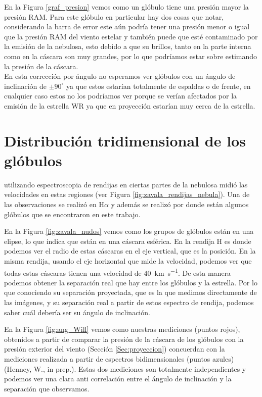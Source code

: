 \documentclass{book}
\begin{document}
En la Figura \ref{graf_presion} vemos como un glóbulo tiene una presión mayor la presión RAM. Para este glóbulo en particular hay dos cosas que notar, considerando la barra de error este aún podría tener una presión menor o igual que la presión RAM del viento estelar y también puede que esté contaminado por la emisión de la nebulosa, esto debido a que su brillos, tanto en la parte interna como en la cáscara son muy grandes, por lo que podríamos estar sobre estimando la presión de la cáscara.\\

En esta corrección por ángulo no esperamos ver glóbulos con un ángulo de inclinación de $\pm 90^\circ$ ya que estos estarían totalmente de espaldas o de frente, en cualquier caso estos no los podríamos ver porque se verían afectados por la emisión de la estrella WR ya que en proyección estarían muy cerca de la estrella.

\section{Distribución tridimensional de los glóbulos} \label{sec: distrtibucion}

\cite{Zavala:2022} utilizando espectroscopia de rendijas en ciertas partes de la nebulosa midió las velocidades en estas regiones (ver Figura \ref{fig:zavala_rendijas_nebula}). Una de las observaciones se realizó en H$\alpha$ y además se realizó por donde están algunos glóbulos que se encontraron en este trabajo. 

En la Figura \ref{fig:zavala_nudos} vemos como los grupos de glóbulos están en una elipse, lo que indica que están en una cáscara esférica. En la rendija H es donde podemos ver el radio de estas cáscaras en el eje vertical, que es la posición. En la misma rendija, usando el eje horizontal que mide la velocidad, podemos ver que todas estas cáscaras tienen una velocidad de \SI{40}{km.s^{-1}}. De esta manera podemos obtener la separación real que hay entre los glóbulos y la estrella. Por lo que conociendo su separación proyectada, que es la que medimos directamente de las imágenes, y su separación real a partir de estos espectro de rendija, podemos saber cuál debería ser su ángulo de inclinación.

En la Figura \ref{fig:ang_Will} vemos como nuestras mediciones (puntos rojos), obtenidos a partir de comparar la presión de la cáscara de los glóbulos con la presión exterior del viento (Sección \ref{Sec:proyeccion}) concuerdan con la mediciones realizada a partir de espectros bidimensionales (puntos azules) (Henney, W., in prep.). Estas dos mediciones son totalmente independientes y podemos ver una clara anti correlación entre el ángulo de inclinación y la separación que observamos.
\end{document}

